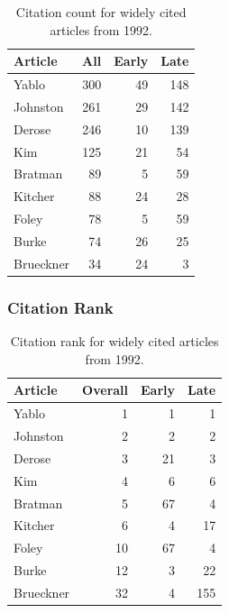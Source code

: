 \documentclass[
  10pt,
  letterpaper,
  DIV=11,
  numbers=noendperiod,
  twoside]{scrartcl}
\begin{document}
\begin{longtable}[]{@{}lrrr@{}}

\caption{\label{tbl-citation-count-1992}Citation count for widely cited
articles from 1992.}

\tabularnewline

\toprule\noalign{}
Article & All & Early & Late \\
\midrule\noalign{}
\endhead
\bottomrule\noalign{}
\endlastfoot
Yablo & 300 & 49 & 148 \\
Johnston & 261 & 29 & 142 \\
Derose & 246 & 10 & 139 \\
Kim & 125 & 21 & 54 \\
Bratman & 89 & 5 & 59 \\
Kitcher & 88 & 24 & 28 \\
Foley & 78 & 5 & 59 \\
Burke & 74 & 26 & 25 \\
Brueckner & 34 & 24 & 3 \\

\end{longtable}

\subsubsection*{Citation Rank}\label{sec-rank-1992}

\begin{longtable}[]{@{}lrrr@{}}

\caption{\label{tbl-citation-rank-1992}Citation rank for widely cited
articles from 1992.}

\tabularnewline

\toprule\noalign{}
Article & Overall & Early & Late \\
\midrule\noalign{}
\endhead
\bottomrule\noalign{}
\endlastfoot
Yablo & 1 & 1 & 1 \\
Johnston & 2 & 2 & 2 \\
Derose & 3 & 21 & 3 \\
Kim & 4 & 6 & 6 \\
Bratman & 5 & 67 & 4 \\
Kitcher & 6 & 4 & 17 \\
Foley & 10 & 67 & 4 \\
Burke & 12 & 3 & 22 \\
Brueckner & 32 & 4 & 155 \\

\end{longtable}
\end{document}

